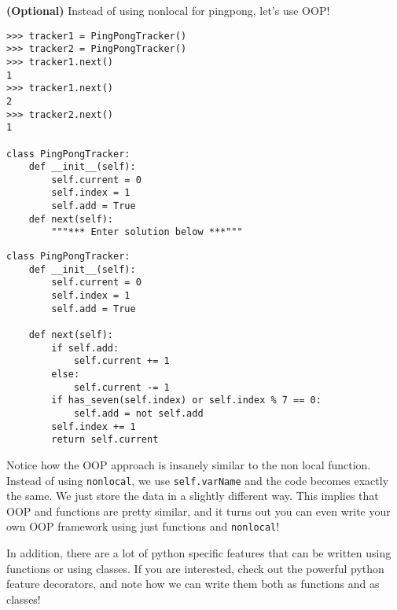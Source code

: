 \begin{blocksection}
\question \textbf{(Optional)} Instead of using nonlocal for pingpong, let's use OOP!

\begin{nonsol}
\begin{lstlisting}
>>> tracker1 = PingPongTracker()
>>> tracker2 = PingPongTracker()
>>> tracker1.next()
1
>>> tracker1.next()
2
>>> tracker2.next()
1

class PingPongTracker:
    def __init__(self):
        self.current = 0
        self.index = 1
        self.add = True
    def next(self):
        """*** Enter solution below ***"""
\end{lstlisting}
\end{nonsol}

\begin{solution}[0.3in]
\begin{lstlisting}
class PingPongTracker:
    def __init__(self):
        self.current = 0
        self.index = 1
        self.add = True

    def next(self):
        if self.add:
            self.current += 1
        else:
            self.current -= 1
        if has_seven(self.index) or self.index % 7 == 0:
            self.add = not self.add
        self.index += 1
        return self.current

\end{lstlisting}
Notice how the OOP approach is insanely similar to the non local function.
Instead of using \texttt{nonlocal}, we use \texttt{self.varName} and the code
becomes exactly the same. We just store the data in a slightly different way.
This implies that OOP and functions are pretty similar, and it turns out you can
even write your own OOP framework using just functions and \texttt{nonlocal}!

In addition, there are a lot of python specific features that can be written
using functions or using classes. If you are interested, check out the powerful
python feature decorators, and note how we can write them both as functions and
as classes!
\end{solution}

\end{blocksection}
